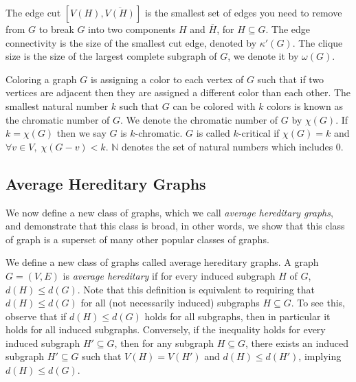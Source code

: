 \documentclass{article}
\begin{document}
The edge cut $[V(H),\overline{V(H)}]$ is the smallest set of edges you need to remove from $G$ to break $G$ into two components $H$ and $\overline{H}$, for $H \subseteq G$. The edge connectivity is the size of the smallest cut edge, denoted by $\kappa'(G)$. 
The clique size is the size of the largest complete subgraph of $G$, we denote it by $\omega(G)$. 

Coloring a graph $G$ is assigning a color to each vertex of $G$ such that if two vertices are adjacent then they are assigned a different color than each other. The smallest natural number $k$ such that $G$ can be colored with $k$ colors is known as the chromatic number of $G$. We denote the chromatic number of $G$ by $\chi(G)$.
If $k = \chi(G)$ then we say $G$ is $k$-chromatic. $G$ is called $k$-critical if $\chi(G) = k$ and $\forall v \in V,\; \chi(G-v) < k$. $\mathbb{N}$ denotes the set of natural numbers which includes $0$.



\subsection{Average Hereditary Graphs}\label{sec: avg}
We now define a new class of graphs, which we call \emph{average hereditary graphs}, and demonstrate that this class is broad, in other words, we show that this class of graph is a superset of many other popular classes of graphs.

We define a new class of graphs called average hereditary graphs. A graph $G = (V,E)$ is \emph{average hereditary} if for every induced subgraph $H$ of $G$, $d(H) \leq d(G)$. 
Note that this definition is equivalent to requiring that $d(H) \leq d(G)$ for all (not necessarily induced) subgraphs $H \subseteq G$. To see this, observe that if $d(H) \leq d(G)$ holds for all subgraphs, then in particular it holds for all induced subgraphs. Conversely, if the inequality holds for every induced subgraph $H' \subseteq G$, then for any subgraph $H \subseteq G$, there exists an induced subgraph $H' \subseteq G$ such that $V(H) = V(H')$ and $d(H) \leq d(H')$, implying $d(H) \leq d(G)$.
\end{document}
